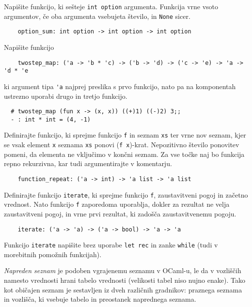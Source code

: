 \documentclass[arhiv]{../izpit}
\begin{document}
	
	

	\naloga 
  
	\podnaloga Napišite funkcijo, ki sešteje \verb|int option| argumenta. Funkcija vrne vsoto argumentov, če oba argumenta vsebujeta število, in \verb|None| sicer.
	\begin{verbatim}
    option_sum: int option -> int option -> int option
	\end{verbatim}  

    \podnaloga Napišite funkcijo
  \begin{verbatim}
    twostep_map: ('a -> 'b * 'c) -> ('b -> 'd) -> ('c -> 'e) -> 'a -> 'd * 'e
    \end{verbatim}
ki argument tipa \verb|'a| najprej preslika s prvo funkcijo, nato pa na komponentah ustrezno uporabi drugo in tretjo funkcijo.
  \begin{verbatim}
  # twostep_map (fun x -> (x, x)) ((+)1) ((-)2) 3;;
  - : int * int = (4, -1)
  \end{verbatim}
  
  \podnaloga Definirajte funkcijo, ki sprejme funkcijo \verb|f| in seznam \verb|xs| ter vrne nov seznam, kjer se vsak element \verb|x| seznama \verb|xs| ponovi (\verb|f x|)-krat. Nepozitivno število ponovitev pomeni, da elementa ne vključimo v končni seznam. Za vse točke naj bo funkcija repno rekurzivna, kar tudi argumentirajte v komentarju.
  \begin{verbatim}
    function_repeat: ('a -> int) -> 'a list -> 'a list
  \end{verbatim}
  
	
 \podnaloga Definirajte funkcijo \verb|iterate|, ki sprejme funkcijo \verb|f|, zaustavitveni pogoj in začetno vrednost. Nato funkcijo \verb|f| zaporedoma uporablja, dokler za rezultat ne velja zaustavitveni pogoj, in vrne prvi rezultat, ki zadošča zaustavitvenemu pogoju.
	\begin{verbatim}
    iterate: ('a -> 'a) -> ('a -> bool) -> 'a -> 'a
	\end{verbatim}
     Funkcijo \verb|iterate| napišite brez uporabe \verb|let rec| in zanke \verb|while| (tudi v morebitnih pomožnih funkcijah).
  
    
  
  \naloga
  
 \textit{Napreden seznam} je podoben vgrajenemu seznamu v OCaml-u, le da v vozliščih namesto vrednosti hrani tabelo vrednosti (velikosti tabel niso nujno enake). Tako kot običajen seznam je sestavljen iz dveh različnih gradnikov: praznega seznama in vozlišča, ki vsebuje tabelo in preostanek naprednega seznama.
	
\end{document}
